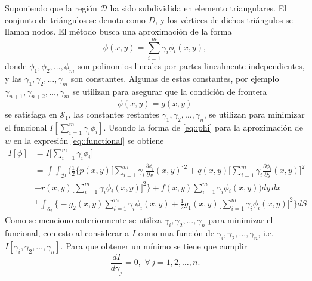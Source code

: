 \documentclass[a4paper]{article}
\begin{document}
Suponiendo que la región $\mathcal{D}$ ha sido subdividida en elemento triangulares. El conjunto de triángulos se denota como $D$, y los vértices de dichos triángulos se llaman nodos. El método busca una aproximación de la forma 
\begin{equation}
\phi(x,y)=\sum_{i=1}^{m}\gamma_i \phi_i(x,y),
\end{equation}
donde $\phi_1,\phi_2,\hdots,\phi_m$ son polinomios lineales por partes linealmente independientes, y las $\gamma_1, \gamma_2,\hdots,\gamma_m$ son constantes. Algunas de estas constantes, por ejemplo $\gamma_{n+1}, \gamma_{n+2},\hdots,\gamma_m$ se utilizan para asegurar que la condición de frontera 
\begin{equation}\label{eq::phi}
\phi(x,y)=g(x,y)
\end{equation}
se satisfaga en $\mathcal{S}_1$, las constantes restantes $\gamma_1,\gamma_2,\hdots,\gamma_n$, se utilizan para minimizar el funcional $I[\sum_{i=1}^m \gamma_i \phi_i]$. Usando la forma de \ref{eq::phi} para la aproximación de $w$ en la expresión \ref{eq::functional} se obtiene
\begin{equation}\label{eq::aproximated_functional}
\begin{aligned}
I[\phi]&=I\Big[ \sum_{i=1}^{m} \gamma_i \phi_i \Big]\\
&=\int\int_{\mathcal{D}}\Bigg(\frac{1}{2}\Bigg\{ p(x,y)\Big[ \sum_{i=1}^{m}\gamma_i \frac{\partial \phi_i}{\partial x}(x,y)\Big]^2 + q(x,y)\Big[ \sum_{i=1}^{m}\gamma_i \frac{\partial \phi_i}{\partial y}(x,y)\Big]^2\\
&-r(x,y)\Big[ \sum_{i=1}^{m}\gamma_i \phi_i(x,y)\Big]^2\Bigg\}+f(x,y)\sum_{i=1}^m \gamma_i \phi_i(x,y)\Bigg)dy\, dx\\
&^+\int_{\mathcal{S}_2}\Bigg\{ -g_2(x,y)\sum_{i=1}^m \gamma_i \phi_i(x,y)+\frac{1}{2}g_1(x,y)\Big[\sum_{i=1}^m \gamma_i \phi_i(x,y)\Big]^2\Bigg\}dS
\end{aligned}
\end{equation}
Como se menciono anteriormente se utiliza $\gamma_i, \gamma_2,\hdots, \gamma_n$ para minimizar el funcional, con esto al considerar a $I$ como una función de $\gamma_i, \gamma_2,\hdots, \gamma_n$, i.e. $I[\gamma_i, \gamma_2,\hdots, \gamma_n]$. Para que obtener un mínimo se tiene que cumplir
\begin{equation}\label{eq::minimun_condition}
\frac{d I}{d \gamma_j}=0,\,\, \forall\, j=1,2,\hdots,n.
\end{equation}
\end{document}
